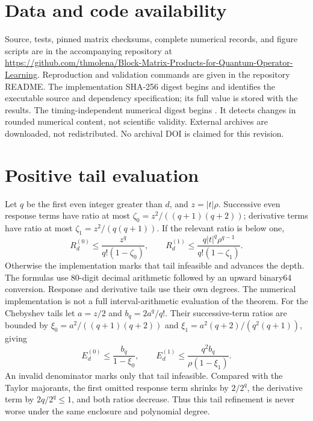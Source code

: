 \documentclass[10pt,letterpaper,twoside]{article}
\begin{document}
\section{Data and code availability}
Source, tests, pinned matrix checksums, complete numerical records, and figure
scripts are in the accompanying repository at
\url{https://github.com/thmolena/Block-Matrix-Products-for-Quantum-Operator-Learning}.
Reproduction and validation commands are given in the repository README. The
implementation SHA-256 digest begins \ImplementationDigest{} and identifies
the executable source and dependency specification; its full value is stored
with the results. The timing-independent numerical digest begins
\SemanticDigest{}. It detects changes in rounded numerical content, not
scientific validity. External archives are downloaded, not redistributed.
No archival DOI is claimed for this revision.

\FloatBarrier
\appendix
\section{Positive tail evaluation}
Let $q$ be the first even integer greater than $d$, and $z=|t|\rho$.
Successive even response terms have ratio at most
$\zeta_0=z^2/((q+1)(q+2))$; derivative terms have ratio at most
$\zeta_1=z^2/(q(q+1))$. If the relevant ratio is below one,
\begin{equation}
 R_d^{(0)}\le\frac{z^q}{q!(1-\zeta_0)},\qquad
 R_d^{(1)}\le\frac{q|t|^q\rho^{q-1}}{q!(1-\zeta_1)}.
\end{equation}
Otherwise the implementation marks that tail infeasible and advances the depth.
The formulas use 80-digit decimal arithmetic followed by an upward binary64
conversion. Response and derivative tails use their own degrees. The numerical
implementation is not a full interval-arithmetic evaluation of the theorem.
For the Chebyshev tails let $a=z/2$ and $b_q=2a^q/q!$. Their successive-term
ratios are bounded by
$\xi_0=a^2/((q+1)(q+2))$ and
$\xi_1=a^2(q+2)/(q^2(q+1))$, giving
\begin{equation}
 E_d^{(0)}\le\frac{b_q}{1-\xi_0},\qquad
 E_d^{(1)}\le\frac{q^2b_q}{\rho(1-\xi_1)}.
\end{equation}
An invalid denominator marks only that tail infeasible. Compared with the
Taylor majorants, the first omitted response term shrinks by $2/2^q$, the
derivative term by $2q/2^q\le1$, and both ratios decrease. Thus this tail
refinement is never worse under the same enclosure and polynomial degree.
\end{document}
